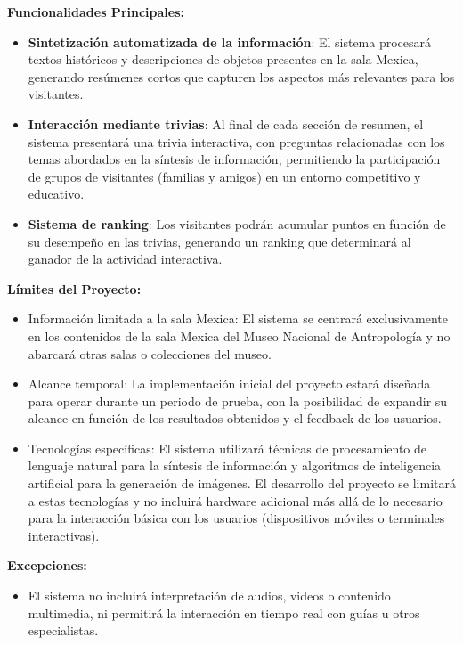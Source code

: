 \documentclass{report}
\begin{document}
    \textbf{Funcionalidades Principales:}
    \begin{itemize}
        \item \textbf{Sintetización automatizada de la información}: El sistema procesará textos históricos y descripciones de objetos presentes en la sala Mexica, generando resúmenes cortos que capturen los aspectos más relevantes para los visitantes.
        \item \textbf{Interacción mediante trivias}: Al final de cada sección de resumen, el sistema presentará una trivia interactiva, con preguntas relacionadas con los temas abordados en la síntesis de información, permitiendo la participación de grupos de visitantes (familias y amigos) en un entorno competitivo y educativo.
        \item \textbf{Sistema de ranking}: Los visitantes podrán acumular puntos en función de su desempeño en las trivias, generando un ranking que determinará al ganador de la actividad interactiva.
    \end{itemize}
        
    \textbf{Límites del Proyecto:}
    \begin{itemize}
        \item Información limitada a la sala Mexica: El sistema se centrará exclusivamente en los contenidos de la sala Mexica del Museo Nacional de Antropología y no abarcará otras salas o colecciones del museo.
        \item Alcance temporal: La implementación inicial del proyecto estará diseñada para operar durante un periodo de prueba, con la posibilidad de expandir su alcance en función de los resultados obtenidos y el feedback de los usuarios.
        \item Tecnologías específicas: El sistema utilizará técnicas de procesamiento de lenguaje natural para la síntesis de información y algoritmos de inteligencia artificial para la generación de imágenes. El desarrollo del proyecto se limitará a estas tecnologías y no incluirá hardware adicional más allá de lo necesario para la interacción básica con los usuarios (dispositivos móviles o terminales interactivas).
    \end{itemize}
        
    \textbf{Excepciones:}
    \begin{itemize}
        \item El sistema no incluirá interpretación de audios, videos o contenido multimedia, ni permitirá la interacción en tiempo real con guías u otros especialistas.
    \end{itemize}
        
\end{document}
